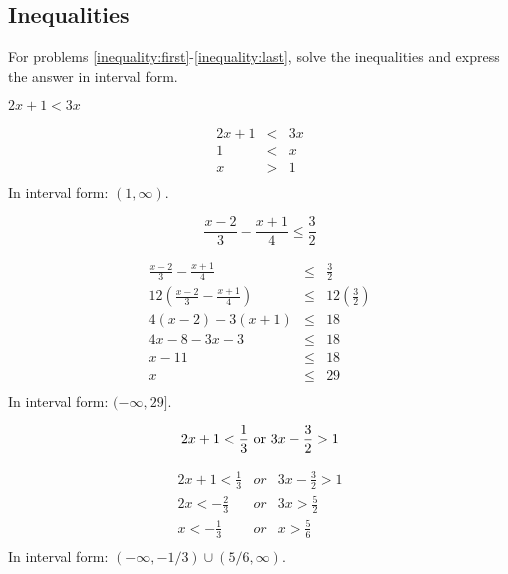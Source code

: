\documentclass[fleqn,addpoints]{exam}
\begin{document}
\begin{questions}
\begin{parts}
\end{parts}

\subsection{Inequalities}

For problems \ref{inequality:first}-\ref{inequality:last}, solve the inequalities and express the answer in interval form.

\question[5]
\label{inequality:first}
\( 2x + 1 < 3x \)
\begin{solution}[4 cm]
\begin{eqnarray*}
  2x + 1 &<& 3x \\
  1 &<& x \\
  x &>& 1 \\
\end{eqnarray*}
In interval form: \( (1, \infty) \).

\end{solution}

\question[5]
\[ \frac{x - 2}{3} - \frac{x + 1}{4} \leq \frac{3}{2} \]
\begin{solution}[4 cm]
\begin{eqnarray*}
  \frac{x - 2}{3} - \frac{x + 1}{4} &\leq& \frac{3}{2} \\
  12 \left( \frac{x - 2}{3} - \frac{x + 1}{4} \right) &\leq& 12 \left( \frac{3}{2} \right) \\
  4(x - 2) - 3(x + 1) &\leq& 18 \\
  4x - 8 - 3x - 3 &\leq& 18 \\
  x - 11 &\leq& 18 \\
  x &\leq& 29 \\
\end{eqnarray*}
In interval form: \( (-\infty, 29] \).

\end{solution}

\question[5]
\[ 2x + 1 < \frac{1}{3} \) or \( \displaystyle 3x - \frac{3}{2} > 1 \]
\begin{solution}[4 cm]
\begin{eqnarray*}
  2x + 1 < \frac{1}{3}  &or& 3x - \frac{3}{2} > 1 \\
  2x < -\frac{2}{3}  &or& 3x > \frac{5}{2} \\
  x < -\frac{1}{3}  &or& x > \frac{5}{6} \\
\end{eqnarray*}
In interval form: \( (-\infty, -1/3) \cup (5/6, \infty) \).


\end{solution}
\end{questions}
\end{document}
